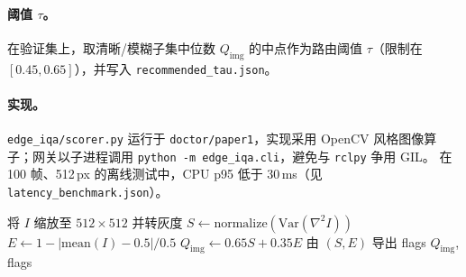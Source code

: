 \paragraph{阈值 $\tau$。}
在验证集上，取清晰/模糊子集中位数 $Q_{\mathrm{img}}$ 的中点作为路由阈值 $\tau$（限制在 $[0.45,0.65]$），并写入 \texttt{recommended\_tau.json}。

\paragraph{实现。}
\texttt{edge\_iqa/scorer.py} 运行于 \texttt{doctor/paper1}，实现采用 OpenCV 风格图像算子；网关以子进程调用 \texttt{python -m edge\_iqa.cli}，避免与 \texttt{rclpy} 争用 GIL。
在 100 帧、512\,px 的离线测试中，CPU p95 低于 30\,ms（见 \texttt{latency\_benchmark.json}）。

\begin{algorithm}[t]
\caption{Edge-IQA 打分}
\begin{algorithmic}[1]
\STATE 将 $I$ 缩放至 $512\times512$ 并转灰度
\STATE $S \leftarrow \mathrm{normalize}(\mathrm{Var}(\nabla^2 I))$
\STATE $E \leftarrow 1 - | \mathrm{mean}(I) - 0.5 | / 0.5$
\STATE $Q_{\mathrm{img}} \leftarrow 0.65 S + 0.35 E$
\STATE 由 $(S,E)$ 导出 flags
\RETURN $Q_{\mathrm{img}}$, flags
\end{algorithmic}
\end{algorithm}
